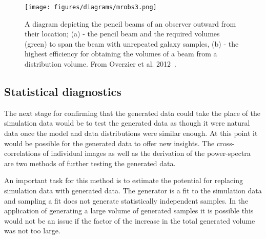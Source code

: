\documentclass[twocolumn]{article}
\numberwithin{equation}{section}
\begin{document}
\begin{figure}[hbt!]
\texttt{[image: figures/diagrams/mrobs3.png]}
\centering
\caption{A diagram depicting the pencil beams of an observer outward from their location; (a) - the pencil beam and the 
required volumes (green) to span the beam with unrepeated galaxy samples, (b) - the highest efficiency for obtaining the
volumes of a beam from a distribution volume. From Overzier et al. 2012~\cite{MRObs}.}
\label{fig:MRObs}
\end{figure}



\subsection{Statistical diagnostics}

The next stage for confirming that the generated data could take the place of the simulation data would be to test the 
generated data as though it were natural data once the model and data distributions were similar enough. At this point it 
would be possible for the generated data to offer new insights. The cross-correlations of individual images as well as the 
derivation of the power-spectra are two methods of further testing the generated data.

An important task for this method is to estimate the potential for replacing simulation data with generated data. The 
generator is a fit to the simulation data and sampling a fit does not generate statistically independent samples. In the 
application of generating a large volume of generated samples it is possible this would not be an issue if the factor of 
the increase in the total generated volume was not too large.
\end{document}
